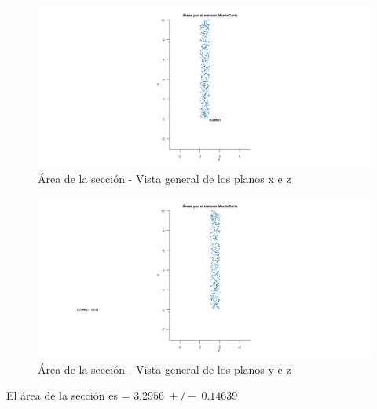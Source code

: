 \documentclass{article}
\begin{document}
\clearpage
\newpage

\begin{figure}[H]
\centering
    \includegraphics[width=1\textwidth]{images/FIG09C.png}
    \caption{Área de la sección - Vista general de los planos x e z}
\end{figure}

\begin{figure}[H]
\centering
    \includegraphics[width=1\textwidth]{images/FIG09D.png}
    \caption{Área de la sección - Vista general de los planos y e z}
\end{figure}

El área de la sección es = $3.2956~+/-~0.14639$
\end{document}
